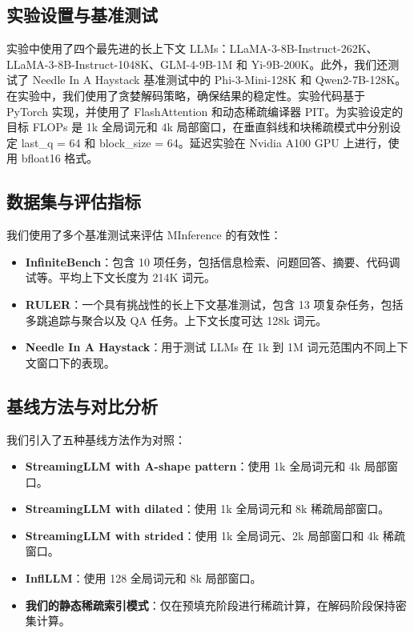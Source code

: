\documentclass[twocolumn, 10pt]{article} %
\theoremstyle{remark}
\begin{document}
\subsection{实验设置与基准测试}
实验中使用了四个最先进的长上下文 LLMs：LLaMA-3-8B-Instruct-262K、LLaMA-3-8B-Instruct-1048K、GLM-4-9B-1M 和 Yi-9B-200K。此外，我们还测试了 Needle In A Haystack 基准测试中的 Phi-3-Mini-128K 和 Qwen2-7B-128K。在实验中，我们使用了贪婪解码策略，确保结果的稳定性。实验代码基于 PyTorch 实现，并使用了 FlashAttention 和动态稀疏编译器 PIT。为实验设定的目标 FLOPs 是 1k 全局词元和 4k 局部窗口，在垂直斜线和块稀疏模式中分别设定 last\_q = 64 和 block\_size = 64。延迟实验在 Nvidia A100 GPU 上进行，使用 bfloat16 格式。

\subsection{数据集与评估指标}
我们使用了多个基准测试来评估 MInference 的有效性：

\begin{itemize}
    \item \textbf{InfiniteBench}：包含 10 项任务，包括信息检索、问题回答、摘要、代码调试等。平均上下文长度为 214K 词元。
    \item \textbf{RULER}：一个具有挑战性的长上下文基准测试，包含 13 项复杂任务，包括多跳追踪与聚合以及 QA 任务。上下文长度可达 128k 词元。
    \item \textbf{Needle In A Haystack}：用于测试 LLMs 在 1k 到 1M 词元范围内不同上下文窗口下的表现。
\end{itemize}

\subsection{基线方法与对比分析}
我们引入了五种基线方法作为对照：

\begin{itemize}
    \item \textbf{StreamingLLM with A-shape pattern}：使用 1k 全局词元和 4k 局部窗口。
    \item \textbf{StreamingLLM with dilated}：使用 1k 全局词元和 8k 稀疏局部窗口。
    \item \textbf{StreamingLLM with strided}：使用 1k 全局词元、2k 局部窗口和 4k 稀疏窗口。
    \item \textbf{InflLLM}：使用 128 全局词元和 8k 局部窗口。
    \item \textbf{我们的静态稀疏索引模式}：仅在预填充阶段进行稀疏计算，在解码阶段保持密集计算。
\end{itemize}
\end{document}
